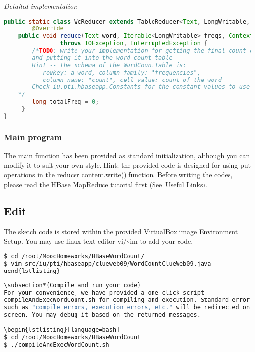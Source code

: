 \textit{Detailed implementation}
\begin{lstlisting}[language=java] 
public static class WcReducer extends TableReducer<Text, LongWritable, ImmutableBytesWritable> {
    	@Override
    public void reduce(Text word, Iterable<LongWritable> freqs, Context context)
                throws IOException, InterruptedException {
        /*TODO: write your implementation for getting the final count of each word
        and putting it into the word count table 
        Hint -- the schema of the WordCountTable is: 
           rowkey: a word, column family: "frequencies", 
           column name: "count", cell value: count of the word
        Check iu.pti.hbaseapp.Constants for the constant values to use.
	*/
    	long totalFreq = 0;
     }
}
 \end{lstlisting}
\subsubsection*{Main program }
The main function has been provided as standard initialization, although you
can modify it to suit your own style. Hint: the provided code is designed for
using put operations in the reducer content.write() function. Before writing
the codes, please read the HBase MapReduce tutorial first
(See~\hyperlink{link_exercise4}{Useful Links}).



%

\subsection*{Edit}
 The sketch code is stored within the provided VirtualBox image Environment
 Setup. You may use linux text editor vi/vim to add your code.

\begin{lstlisting}[language=bash] 
$ cd /root/MoocHomeworks/HBaseWordCount/
$ vim src/iu/pti/hbaseapp/clueweb09/WordCountClueWeb09.java
uend{lstlisting}
 
\subsection*{Compile and run your code}
For your convenience, we have provided a one-click script
compileAndExecWordCount.sh for compiling and execution. Standard error messages
such as "compile errors, execution errors, etc." will be redirected on the
screen. You may debug it based on the returned messages.

\begin{lstlisting}[language=bash] 
$ cd /root/MoocHomeworks/HBaseWordCount
$ ./compileAndExecWordCount.sh
\end{lstlisting}
 
